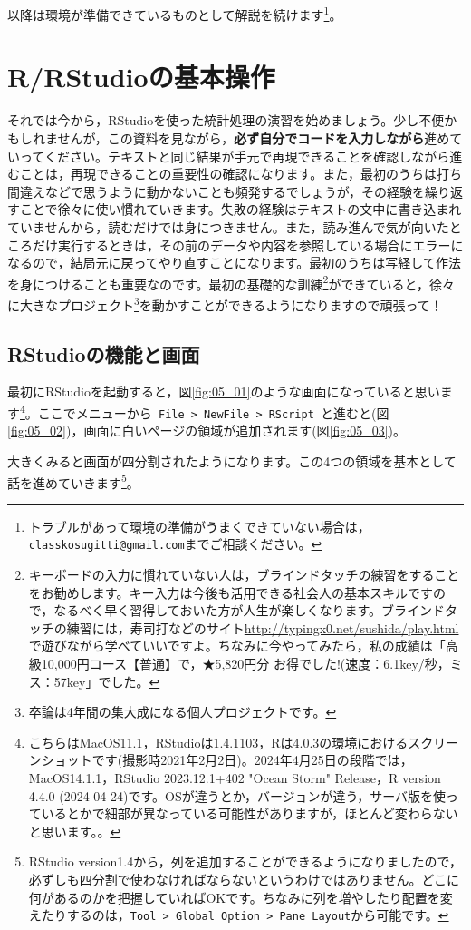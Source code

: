 \documentclass{ltjsbook}
\begin{document}
以降は環境が準備できているものとして解説を続けます\footnote{トラブルがあって環境の準備がうまくできていない場合は，\texttt{classkosugitti@gmail.com}までご相談ください。}。

\section{R/RStudioの基本操作}
それでは今から，RStudioを使った統計処理の演習を始めましょう。少し不便かもしれませんが，この資料を見ながら，\textbf{必ず自分でコードを入力しながら}進めていってください。テキストと同じ結果が手元で再現できることを確認しながら進むことは，再現できることの重要性の確認になります。また，最初のうちは打ち間違えなどで思うように動かないことも頻発するでしょうが，その経験を繰り返すことで徐々に使い慣れていきます。失敗の経験はテキストの文中に書き込まれていませんから，読むだけでは身につきません。また，読み進んで気が向いたところだけ実行するときは，その前のデータや内容を参照している場合にエラーになるので，結局元に戻ってやり直すことになります。最初のうちは写経して作法を身につけることも重要なのです。最初の基礎的な訓練\footnote{キーボードの入力に慣れていない人は，ブラインドタッチの練習をすることをお勧めします。キー入力は今後も活用できる社会人の基本スキルですので，なるべく早く習得しておいた方が人生が楽しくなります。ブラインドタッチの練習には，寿司打などのサイト\url{http://typingx0.net/sushida/play.html}で遊びながら学べていいですよ。ちなみに今やってみたら，私の成績は「高級10,000円コース【普通】で，★5,820円分 お得でした!(速度：6.1key/秒，ミス：57key」でした。}ができていると，徐々に大きなプロジェクト\footnote{卒論は4年間の集大成になる個人プロジェクトです。}を動かすことができるようになりますので頑張って！

\subsection{RStudioの機能と画面}
最初にRStudioを起動すると，図\ref{fig:05_01}のような画面になっていると思います\footnote{こちらはMacOS11.1，RStudioは1.4.1103，Rは4.0.3の環境におけるスクリーンショットです(撮影時2021年2月2日)。2024年4月25日の段階では，MacOS14.1.1，RStudio 2023.12.1+402 "Ocean Storm" Release，R version 4.4.0 (2024-04-24)です。OSが違うとか，バージョンが違う，サーバ版を使っているとかで細部が異なっている可能性がありますが，ほとんど変わらないと思います。。}。ここでメニューから\verb| File > NewFile > RScript |と進むと(図\ref{fig:05_02})，画面に白いページの領域が追加されます(図\ref{fig:05_03})。

大きくみると画面が四分割されたようになります。この4つの領域を基本として話を進めていきます\footnote{RStudio version1.4から，列を追加することができるようになりましたので，必ずしも四分割で使わなければならないというわけではありません。どこに何があるのかを把握していればOKです。ちなみに列を増やしたり配置を変えたりするのは，\verb|Tool > Global Option > Pane Layout|から可能です。}。
\end{document}
